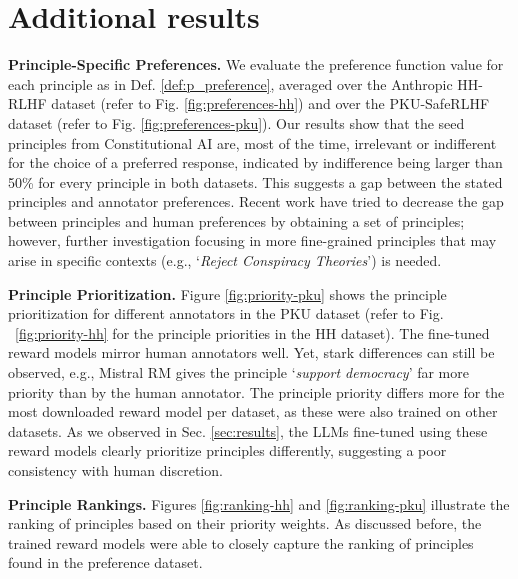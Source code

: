 \documentclass{article}
\begin{document}
\section{Additional results}\label{sec:additional_results}
\noindent \textbf{Principle-Specific Preferences.} We evaluate the preference function value for each principle as in Def. \ref{def:p_preference}, averaged over the Anthropic HH-RLHF dataset (refer to Fig. \ref{fig:preferences-hh}) and over the PKU-SafeRLHF dataset (refer to Fig. \ref{fig:preferences-pku}). 
Our results show that the seed principles from Constitutional AI are, most of the time, irrelevant or indifferent for the choice of a preferred response, indicated by indifference being larger than 50\% for every principle in both datasets.
This suggests a gap between the stated principles and annotator preferences.
Recent work \cite{obiValueImprintTechnique2024, klingefjord2024humanvaluesalignai, findeis2024inverse} have tried to decrease the gap between principles and human preferences by obtaining a set of principles; however, further investigation focusing in more fine-grained principles that may arise in specific contexts (e.g., `\textit{Reject Conspiracy Theories}') is needed.

\noindent \textbf{Principle Prioritization.} Figure \ref{fig:priority-pku} shows the principle prioritization for different annotators in the PKU dataset (refer to Fig. ~\ref{fig:priority-hh} for the principle priorities in the HH dataset). The fine-tuned reward models mirror human annotators well.
Yet, stark differences can still be observed, e.g., Mistral RM gives the principle `\textit{support democracy}' far more priority than by the human annotator. 
The principle priority differs more for the most downloaded reward model per dataset, as these were also trained on other datasets.
As we observed in Sec. \ref{sec:results}, the LLMs fine-tuned using these reward models clearly prioritize principles differently, suggesting a poor consistency with human discretion.

\noindent \textbf{Principle Rankings.} Figures \ref{fig:ranking-hh} and \ref{fig:ranking-pku} illustrate the ranking of principles based on their priority weights. As discussed before, the trained reward models were able to closely capture the ranking of principles found in the preference dataset.
\end{document}
